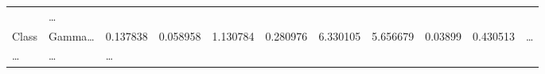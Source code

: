 \documentclass[
]{article}
\begin{document}
\begin{longtable}[]{@{}lllllllllll@{}}
\begin{minipage}[t]{0.06\columnwidth}
\end{minipage} & \begin{minipage}[t]{0.03\columnwidth}\raggedright
\ldots{}\strut
\end{minipage}\tabularnewline
\begin{minipage}[t]{0.06\columnwidth}\raggedright
Class\strut
\end{minipage} & \begin{minipage}[t]{0.06\columnwidth}\raggedright
Gamma\ldots{}\strut
\end{minipage} & \begin{minipage}[t]{0.09\columnwidth}\raggedright
0.137838\strut
\end{minipage} & \begin{minipage}[t]{0.06\columnwidth}\raggedright
0.058958\strut
\end{minipage} & \begin{minipage}[t]{0.09\columnwidth}\raggedright
1.130784\strut
\end{minipage} & \begin{minipage}[t]{0.06\columnwidth}\raggedright
0.280976\strut
\end{minipage} & \begin{minipage}[t]{0.09\columnwidth}\raggedright
6.330105\strut
\end{minipage} & \begin{minipage}[t]{0.06\columnwidth}\raggedright
5.656679\strut
\end{minipage} & \begin{minipage}[t]{0.06\columnwidth}\raggedright
0.03899\strut
\end{minipage} & \begin{minipage}[t]{0.06\columnwidth}\raggedright
0.430513\strut
\end{minipage} & \begin{minipage}[t]{0.03\columnwidth}\raggedright
\ldots{}\strut
\end{minipage}\tabularnewline
\begin{minipage}[t]{0.06\columnwidth}\raggedright
\ldots{}\strut
\end{minipage} & \begin{minipage}[t]{0.06\columnwidth}\raggedright
\ldots{}\strut
\end{minipage} & \begin{minipage}[t]{0.09\columnwidth}\raggedright
\ldots{}\strut
\end{minipage} & \begin{minipage}[t]{0.06\columnwidth}\raggedright

\end{minipage}
\end{longtable}
\end{document}
